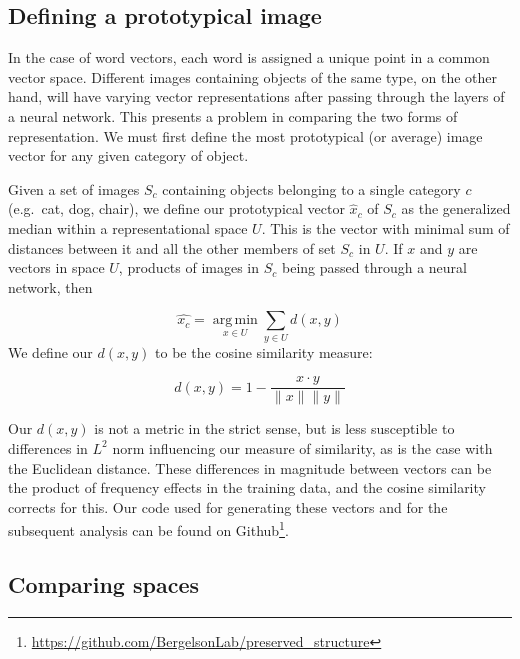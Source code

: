 \documentclass[10pt, letterpaper]{article}
\begin{document}
\subsection{Defining a prototypical
image}\label{defining-a-prototypical-image}

In the case of word vectors, each word is assigned a unique point in a
common vector space. Different images containing objects of the same
type, on the other hand, will have varying vector representations after
passing through the layers of a neural network. This presents a problem
in comparing the two forms of representation. We must first define the
most prototypical (or average) image vector for any given category of
object.

Given a set of images \(S_c\) containing objects belonging to a single
category \(c\) (e.g.~cat, dog, chair), we define our prototypical vector
\(\hat{x}_c\) of \(S_c\) as the generalized median within a
representational space \(U\). This is the vector with minimal sum of
distances between it and all the other members of set \(S_c\) in \(U\).
If \(x\) and \(y\) are vectors in space \(U\), products of images in
\(S_c\) being passed through a neural network, then

\[
 \hat{x_c} = \operatorname*{arg\,min}_{x\in U} \sum_{y\in U} d(x, y)
\] We define our \(d(x, y)\) to be the cosine similarity measure:

\[
d(x, y) = 1 - \frac{x\cdot y}{\|x\|\|y\|}
\]

Our \(d(x, y)\) is not a metric in the strict sense, but is less
susceptible to differences in \(L^2\) norm influencing our measure of
similarity, as is the case with the Euclidean distance. These
differences in magnitude between vectors can be the product of frequency
effects in the training data, and the cosine similarity corrects for
this. Our code used for generating these vectors and for the subsequent
analysis can be found on
Github\footnote{\url{https://github.com/BergelsonLab/preserved_structure}}.

\subsection{Comparing spaces}\label{comparing-spaces}
\end{document}

